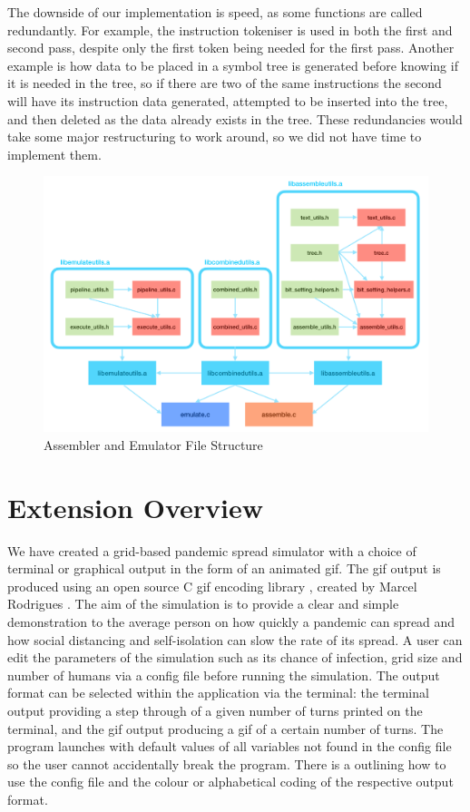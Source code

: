 \documentclass[11pt]{article}
\begin{document}
\par The downside of our implementation is speed, as some functions are called redundantly. 
For example, the instruction tokeniser  is used in both the first and second pass, despite only the first token being needed for the first pass. 
Another example is how data to be placed in a symbol tree is generated before knowing if it is needed in the tree, so if there are two of the same instructions the second will have its instruction data generated, attempted to be inserted into the tree, and then deleted as the data already exists in the tree. 
These redundancies would take some major restructuring to work around, so we did not have time to implement them.

\newpage
\begin{figure}[t]
    \centering
    \includegraphics[scale=0.15]{images/emulate_assemble_structure.jpeg}
    \caption{Assembler and Emulator File Structure}
    \label{Figure 1}
\end{figure}

\section{Extension Overview}
We have created a grid-based pandemic spread simulator with a choice of terminal or graphical output in the form of an animated gif. 
The gif output is produced using an open source C gif encoding library , created by Marcel Rodrigues \cite{gifenc}.
The aim of the simulation is to provide a clear and simple demonstration to the average person on how quickly a pandemic can spread and how social distancing and self-isolation can slow the rate of its spread. 
A user can edit the parameters of the simulation such as its chance of infection, grid size and number of humans via a config file before running the simulation. 
The output format can be selected within the application via the terminal: the terminal output providing a step through of a given number of turns printed on the terminal, and the gif output producing a gif of a certain number of turns. The program launches with default values of all variables not found in the config file so the user cannot accidentally break the program.
There is a  outlining how to use the config file and the colour or alphabetical coding of the respective output format.
\end{document}
